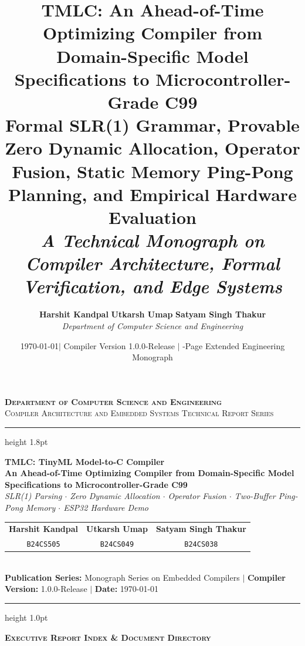 \documentclass[11pt,a4paper]{article}
\title{
    \vspace{-1.5cm}
    \textbf{\huge TMLC: An Ahead-of-Time Optimizing Compiler from Domain-Specific Model Specifications to Microcontroller-Grade C99} \\[0.6em]
    \large\textbf{Formal SLR(1) Grammar, Provable Zero Dynamic Allocation, Operator Fusion, Static Memory Ping-Pong Planning, and Empirical Hardware Evaluation} \\[0.4em]
    \normalsize\textit{A Technical Monograph on Compiler Architecture, Formal Verification, and Edge Systems}
}
\author{
    \textbf{Harshit Kandpal} \qquad \textbf{Utkarsh Umap} \qquad \textbf{Satyam Singh Thakur} \\[0.4em]
    \textit{Department of Computer Science and Engineering}
}
\date{\today \quad $\vert$ \quad Compiler Version 1.0.0-Release \quad $\vert$ \quad 50-Page Extended Engineering Monograph}
\begin{document}
\begin{titlepage}
\thispagestyle{empty}
\begin{center}
    {\large \textsc{\textbf{Department of Computer Science and Engineering}}}\\[0.25em]
    {\normalsize \textsc{Compiler Architecture and Embedded Systems Technical Report Series}}\\[0.6em]
    \hrule height 1.8pt
    \vspace{0.8em}
    
    {\Huge \textbf{TMLC: TinyML Model-to-C Compiler}}\\[0.45em]
    {\large \textbf{An Ahead-of-Time Optimizing Compiler from Domain-Specific Model Specifications to Microcontroller-Grade C99}}\\[0.35em]
    {\small \textit{SLR(1) Parsing $\cdot$ Zero Dynamic Allocation $\cdot$ Operator Fusion $\cdot$ Two-Buffer Ping-Pong Memory $\cdot$ ESP32 Hardware Demo}}\\[1.1em]
    
    \begin{tabular}{ccc}
        \textbf{Harshit Kandpal} & \textbf{Utkarsh Umap} & \textbf{Satyam Singh Thakur} \\
        \texttt{B24CS505} & \texttt{B24CS049} & \texttt{B24CS038} \\
    \end{tabular}\\[0.65em]
    {\footnotesize \textbf{Publication Series:} Monograph Series on Embedded Compilers \quad $\vert$ \quad \textbf{Compiler Version:} 1.0.0-Release \quad $\vert$ \quad \textbf{Date:} \today}
\end{center}

\vspace{0.5em}
\hrule height 1.0pt
\vspace{0.8em}

\begin{center}
    {\large \textbf{\textsc{Executive Report Index \& Document Directory}}}
\end{center}
\vspace{0.2em}


\end{titlepage}
\end{document}
